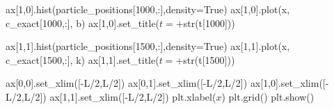 \documentclass[
  letterpaper,
  DIV=11,
  numbers=noendperiod]{scrreprt}
\newenvironment{Shaded}{\begin{snugshade}}{\end{snugshade}}
\newcommand{\BuiltInTok}[1]{\textcolor[rgb]{0.00,0.23,0.31}{#1}}
\newcommand{\DecValTok}[1]{\textcolor[rgb]{0.68,0.00,0.00}{#1}}
\newcommand{\NormalTok}[1]{\textcolor[rgb]{0.00,0.23,0.31}{#1}}
\newcommand{\OperatorTok}[1]{\textcolor[rgb]{0.37,0.37,0.37}{#1}}
\newcommand{\StringTok}[1]{\textcolor[rgb]{0.13,0.47,0.30}{#1}}
\newcommand{\VariableTok}[1]{\textcolor[rgb]{0.07,0.07,0.07}{#1}}
\theoremstyle{plain}
\theoremstyle{definition}
\theoremstyle{plain}
\theoremstyle{remark}
\begin{document}
\begin{Shaded}
\begin{Highlighting}[]
\NormalTok{ax[}\DecValTok{1}\NormalTok{,}\DecValTok{0}\NormalTok{].hist(particle\_positions[}\DecValTok{1000}\NormalTok{,:],density}\OperatorTok{=}\VariableTok{True}\NormalTok{)}
\NormalTok{ax[}\DecValTok{1}\NormalTok{,}\DecValTok{0}\NormalTok{].plot(x, c\_exact[}\DecValTok{1000}\NormalTok{,:], }\StringTok{\textquotesingle{}b\textquotesingle{}}\NormalTok{)}
\NormalTok{ax[}\DecValTok{1}\NormalTok{,}\DecValTok{0}\NormalTok{].set\_title(}\StringTok{\textquotesingle{}$t=$\textquotesingle{}}\OperatorTok{+}\BuiltInTok{str}\NormalTok{(t[}\DecValTok{1000}\NormalTok{]))}

\NormalTok{ax[}\DecValTok{1}\NormalTok{,}\DecValTok{1}\NormalTok{].hist(particle\_positions[}\DecValTok{1500}\NormalTok{,:],density}\OperatorTok{=}\VariableTok{True}\NormalTok{)}
\NormalTok{ax[}\DecValTok{1}\NormalTok{,}\DecValTok{1}\NormalTok{].plot(x, c\_exact[}\DecValTok{1500}\NormalTok{,:], }\StringTok{\textquotesingle{}k\textquotesingle{}}\NormalTok{)}
\NormalTok{ax[}\DecValTok{1}\NormalTok{,}\DecValTok{1}\NormalTok{].set\_title(}\StringTok{\textquotesingle{}$t=$\textquotesingle{}}\OperatorTok{+}\BuiltInTok{str}\NormalTok{(t[}\DecValTok{1500}\NormalTok{]))}

\NormalTok{ax[}\DecValTok{0}\NormalTok{,}\DecValTok{0}\NormalTok{].set\_xlim([}\OperatorTok{{-}}\NormalTok{L}\OperatorTok{/}\DecValTok{2}\NormalTok{,L}\OperatorTok{/}\DecValTok{2}\NormalTok{])}
\NormalTok{ax[}\DecValTok{0}\NormalTok{,}\DecValTok{1}\NormalTok{].set\_xlim([}\OperatorTok{{-}}\NormalTok{L}\OperatorTok{/}\DecValTok{2}\NormalTok{,L}\OperatorTok{/}\DecValTok{2}\NormalTok{])}
\NormalTok{ax[}\DecValTok{1}\NormalTok{,}\DecValTok{0}\NormalTok{].set\_xlim([}\OperatorTok{{-}}\NormalTok{L}\OperatorTok{/}\DecValTok{2}\NormalTok{,L}\OperatorTok{/}\DecValTok{2}\NormalTok{])}
\NormalTok{ax[}\DecValTok{1}\NormalTok{,}\DecValTok{1}\NormalTok{].set\_xlim([}\OperatorTok{{-}}\NormalTok{L}\OperatorTok{/}\DecValTok{2}\NormalTok{,L}\OperatorTok{/}\DecValTok{2}\NormalTok{])}
\NormalTok{plt.xlabel(}\StringTok{\textquotesingle{}$x$\textquotesingle{}}\NormalTok{)}
\NormalTok{plt.grid()}
\NormalTok{plt.show()}
\end{Highlighting}
\end{Shaded}
\end{document}
